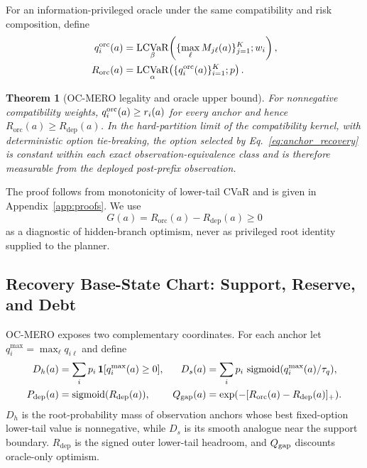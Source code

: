 \documentclass{article} %
\DeclareMathOperator{\sigmoid}{sigmoid}
\DeclareMathOperator{\LCVaR}{LCVaR}
\newcommand{\Rdep}{R_{\mathrm{dep}}}
\newcommand{\Rorc}{R_{\mathrm{orc}}}
\newtheorem{theorem}{Theorem}
\begin{document}
For an information-privileged oracle under the same compatibility and risk composition, define
\begin{align}
 q_i^{\rm orc}(a)
 &=\LCVaR_{\beta}\!\left(\{\max_\ell M_{j\ell}(a)\}_{j=1}^{K};w_i\right),\\
 \Rorc(a)
 &=\LCVaR_{\alpha}\!\left(\{q_i^{\rm orc}(a)\}_{i=1}^{K};p\right).
 \label{eq:nested_oracle}
\end{align}
\begin{theorem}[OC-MERO legality and oracle upper bound]
\label{thm:ocmero}
For nonnegative compatibility weights, $q_i^{\rm orc}(a)\ge r_i(a)$ for every anchor and hence $\Rorc(a)\ge\Rdep(a)$. In the hard-partition limit of the compatibility kernel, with deterministic option tie-breaking, the option selected by Eq.~\eqref{eq:anchor_recovery} is constant within each exact observation-equivalence class and is therefore measurable from the deployed post-prefix observation.
\end{theorem}
The proof follows from monotonicity of lower-tail CVaR and is given in Appendix~\ref{app:proofs}. We use
\begin{equation}
 G(a)=\Rorc(a)-\Rdep(a)\ge0
 \label{eq:oracle_gap}
\end{equation}
as a diagnostic of hidden-branch optimism, never as privileged root identity supplied to the planner.

\subsection{Recovery Base-State Chart: Support, Reserve, and Debt}
\label{subsec:signed_semantics}

OC-MERO exposes two complementary coordinates. For each anchor let $q_i^{\max}=\max_\ell q_{i\ell}$ and define
\begin{align}
 D_h(a)&=\sum_i p_i\,\mathbf{1}[q_i^{\max}(a)\ge0], &
 D_s(a)&=\sum_i p_i\,\sigmoid(q_i^{\max}(a)/\tau_q),\\
 P_{\rm dep}(a)&=\sigmoid(\Rdep(a)), &
 Q_{\rm gap}(a)&=\exp(-[\Rorc(a)-\Rdep(a)]_+).
 \label{eq:boundary_complete}
\end{align}
$D_h$ is the root-probability mass of observation anchors whose best fixed-option lower-tail value is nonnegative, while $D_s$ is its smooth analogue near the support boundary. $\Rdep$ is the signed outer lower-tail headroom, and $Q_{\rm gap}$ discounts oracle-only optimism.
\end{document}
